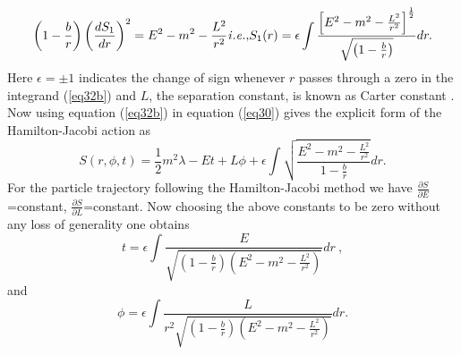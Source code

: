 \documentclass[10pt]{revtex4}
\begin{document}
 \begin{subequations}
 	\begin{equation}\label{eq32a}
 	\left(1-\frac{b}{r}\right)\left(\frac{dS_1}{dr}\right)^2=E^2-m^2-\frac{L^2}{r^2}
 	\end{equation} {\it i.e.,}
 	\begin{equation}\label{eq32b}
 	S_1(r)=\epsilon\int\frac{\Big[E^2-m^2-\frac{L^2}{r^2}\Big]^\frac{1}{2}}{\sqrt{\left(1-\frac{b}{r}\right)}}dr.
 	\end{equation}
 \end{subequations}
Here $\epsilon=\pm1$ indicates the change of sign whenever $r$ passes through a zero in the integrand (\ref{eq32b}) and $L$, the separation constant, is known as Carter constant \cite{r15}. Now using equation (\ref{eq32b}) in equation (\ref{eq30}) gives the explicit form of the Hamilton-Jacobi action as
 \begin{equation} \label{eq34}
S(r,\phi,t)=\frac{1}{2}m^2\lambda-Et+L\phi+\epsilon\int\sqrt{\frac{E^2-m^2-\frac{L^2}{r^2}}{1-\frac{b}{r}}}dr.
\end{equation}
 For the particle trajectory following the Hamilton-Jacobi method we have $\frac{\partial S}{\partial E}$=constant, $\frac{\partial S}{\partial L}$=constant. 
Now choosing the above constants to be zero without any loss of generality one obtains 
\begin{equation}\label{eq35}
t=\epsilon\int\frac{E}{\sqrt{\left(1-\frac{b}{r}\right)\left(E^2-m^2-\frac{L^2}{r^2}\right)}}dr~,
\end{equation}
and
\begin{equation}\label{eq36}
\phi=\epsilon\int\frac{L}{r^2\sqrt{\left(1-\frac{b}{r}\right)\left(E^2-m^2-\frac{L^2}{r^2}\right)}}dr.
\end{equation} 
\end{document}
